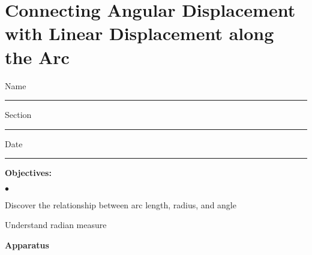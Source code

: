 
\section{Connecting Angular Displacement with Linear Displacement along the Arc}

Name \rule{2.0in}{0.1pt}\hfill{}Section \rule{1.0in}{0.1pt}\hfill{}Date \rule{1.0in}{0.1pt}

{\noindent \bf Objectives:}

\begin{list}{$\bullet$}{\itemsep0pt }

\item Discover the relationship between arc length, radius, and angle \item Understand radian measure

\end{list}

\textbf{Apparatus}

